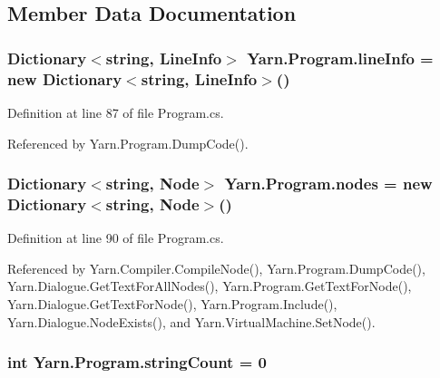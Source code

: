 \subsection{Member Data Documentation}
\hypertarget{a00142_a0d4da395947767b4a1eaaff8a9842adc}{
\subsubsection[{line\-Info}]{\setlength{\rightskip}{0pt plus 5cm}Dictionary$<$string, {\bf Line\-Info}$>$ Yarn.\-Program.\-line\-Info = new Dictionary$<$string, {\bf Line\-Info}$>$()\hspace{0.3cm}{\ttfamily [package]}}}\label{a00142_a0d4da395947767b4a1eaaff8a9842adc}


Definition at line 87 of file Program.\-cs.



Referenced by Yarn.\-Program.\-Dump\-Code().

\hypertarget{a00142_a3f4928a577c88263ad016be259b175c4}{
\subsubsection[{nodes}]{\setlength{\rightskip}{0pt plus 5cm}Dictionary$<$string, {\bf Node}$>$ Yarn.\-Program.\-nodes = new Dictionary$<$string, {\bf Node}$>$()\hspace{0.3cm}{\ttfamily [package]}}}\label{a00142_a3f4928a577c88263ad016be259b175c4}


Definition at line 90 of file Program.\-cs.



Referenced by Yarn.\-Compiler.\-Compile\-Node(), Yarn.\-Program.\-Dump\-Code(), Yarn.\-Dialogue.\-Get\-Text\-For\-All\-Nodes(), Yarn.\-Program.\-Get\-Text\-For\-Node(), Yarn.\-Dialogue.\-Get\-Text\-For\-Node(), Yarn.\-Program.\-Include(), Yarn.\-Dialogue.\-Node\-Exists(), and Yarn.\-Virtual\-Machine.\-Set\-Node().

\hypertarget{a00142_a8ef1d10094ef00311aade6715ba78ec7}{
\subsubsection[{string\-Count}]{\setlength{\rightskip}{0pt plus 5cm}int Yarn.\-Program.\-string\-Count = 0\hspace{0.3cm}{\ttfamily [private]}}}\label{a00142_a8ef1d10094ef00311aade6715ba78ec7}


